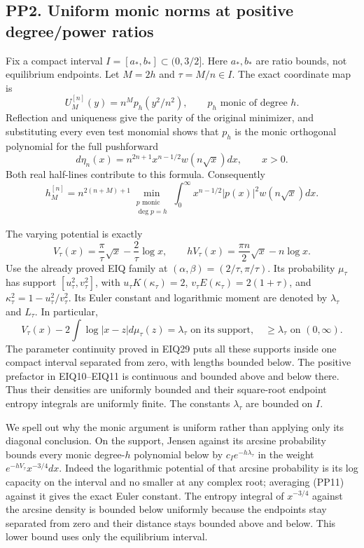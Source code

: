 \documentclass[10pt]{article}
\begin{document}
\subsection{PP2. Uniform monic norms at positive degree/power ratios}\label{pp2.-uniform-monic-norms-at-positive-degreepower-ratios}

Fix a compact interval \(I=[a_*,b_*]\subset(0,3/2]\). Here \(a_*,b_*\) are ratio bounds, not equilibrium endpoints. Let \(M=2h\) and \(\tau=M/n\in I\). The exact coordinate map is \[
U_M^{[n]}(y)=n^Mp_h(y^2/n^2),\qquad p_h\text{ monic of degree }h.
\tag{PP7}
\] Reflection and uniqueness give the parity of the original minimizer, and substituting every even test monomial shows that \(p_h\) is the monic orthogonal polynomial for the full pushforward \[
d\eta_n(x)=n^{2n+1}x^{n-1/2}w(n\sqrt x)dx,\qquad x>0.
\tag{PP8}
\] Both real half-lines contribute to this formula. Consequently \[
h_M^{[n]}=n^{2(n+M)+1}
\min_{\substack{p\text{ monic}\\ \deg p=h}}\int_0^\infty
x^{n-1/2}|p(x)|^2w(n\sqrt x)dx.
\tag{PP9}
\]

The varying potential is exactly \[
V_\tau(x)=\frac\pi\tau\sqrt x-\frac2\tau\log x,
\qquad hV_\tau(x)=\frac{\pi n}{2}\sqrt x-n\log x.
\tag{PP10}
\] Use the already proved EIQ family at \((\alpha,\beta)=(2/\tau,\pi/\tau)\). Its probability \(\mu_\tau\) has support \([u_\tau^2,v_\tau^2]\), with \(u_\tau K(\kappa_\tau)=2\), \(v_\tau E(\kappa_\tau)=2(1+\tau)\), and \(\kappa_\tau^2=1-u_\tau^2/v_\tau^2\). Its Euler constant and logarithmic moment are denoted by \(\lambda_\tau\) and \(L_\tau\). In particular, \[
V_\tau(x)-2\int\log|x-z|d\mu_\tau(z)
=\lambda_\tau\text{ on its support},
\quad\ge\lambda_\tau\text{ on }(0,\infty).
\tag{PP11}
\] The parameter continuity proved in EIQ29 puts all these supports inside one compact interval separated from zero, with lengths bounded below. The positive prefactor in EIQ10--EIQ11 is continuous and bounded above and below there. Thus their densities are uniformly bounded and their square-root endpoint entropy integrals are uniformly finite. The constants \(\lambda_\tau\) are bounded on \(I\).

We spell out why the monic argument is uniform rather than applying only its diagonal conclusion. On the support, Jensen against its arcsine probability bounds every monic degree-\(h\) polynomial below by \(c_Ie^{-h\lambda_\tau}\) in the weight \(e^{-hV_\tau}x^{-3/4}dx\). Indeed the logarithmic potential of that arcsine probability is its log capacity on the interval and no smaller at any complex root; averaging (PP11) against it gives the exact Euler constant. The entropy integral of \(x^{-3/4}\) against the arcsine density is bounded below uniformly because the endpoints stay separated from zero and their distance stays bounded above and below. This lower bound uses only the equilibrium interval.
\end{document}
